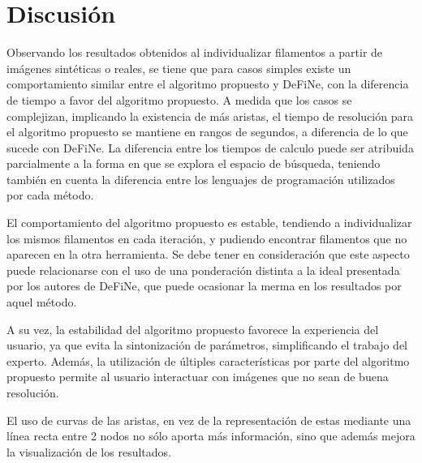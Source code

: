 
\section{Discusi\'on}

Observando los resultados obtenidos al individualizar filamentos a partir de im\'agenes sint\'eticas o reales, se tiene que para casos simples existe un comportamiento similar entre el algoritmo propuesto y DeFiNe, con la diferencia de tiempo a favor del algoritmo propuesto. A medida que los casos se complejizan, implicando la existencia de m\'as aristas, el tiempo de resoluci\'on para el algoritmo propuesto se mantiene en rangos de segundos, a diferencia de lo que sucede con DeFiNe. La diferencia entre los tiempos de calculo puede ser atribuida parcialmente a la forma en que se explora el espacio de b\'usqueda, teniendo tambi\'en en cuenta la diferencia entre los lenguajes de programaci\'on utilizados por cada m\'etodo.


El comportamiento del algoritmo propuesto es estable, tendiendo a individualizar los mismos filamentos en cada iteraci\'on, y pudiendo encontrar filamentos que no aparecen en la otra herramienta. Se debe tener en consideraci\'on que este aspecto puede relacionarse con el uso de una ponderaci\'on distinta a la ideal presentada por los autores de DeFiNe, que puede ocasionar la merma en los resultados por aquel m\'etodo.


A su vez, la estabilidad del algoritmo propuesto favorece la experiencia del usuario, ya que evita la sintonizaci\'on de par\'ametros, simplificando el trabajo del experto. Adem\'as, la utilizaci\'on de \'ultiples caracter\'isticas por parte del algoritmo propuesto permite al usuario interactuar con im\'agenes que no sean de buena resoluci\'on.


El uso de curvas de las aristas, en vez de la representaci\'on de estas mediante una l\'inea recta entre 2 nodos no s\'olo aporta m\'as informaci\'on, sino que adem\'as mejora la visualizaci\'on de los resultados. 


